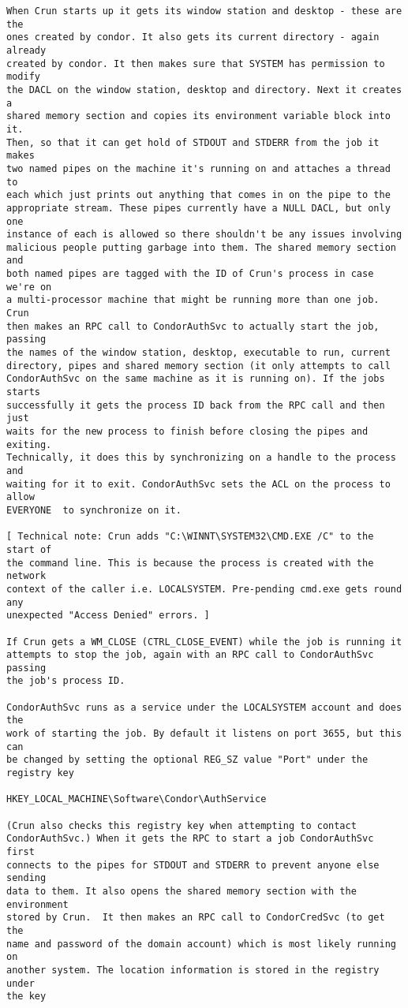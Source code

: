 \begin{verbatim}
When Crun starts up it gets its window station and desktop - these are the 
ones created by condor. It also gets its current directory - again already 
created by condor. It then makes sure that SYSTEM has permission to modify 
the DACL on the window station, desktop and directory. Next it creates a 
shared memory section and copies its environment variable block into it. 
Then, so that it can get hold of STDOUT and STDERR from the job it makes 
two named pipes on the machine it's running on and attaches a thread to 
each which just prints out anything that comes in on the pipe to the 
appropriate stream. These pipes currently have a NULL DACL, but only one 
instance of each is allowed so there shouldn't be any issues involving 
malicious people putting garbage into them. The shared memory section and 
both named pipes are tagged with the ID of Crun's process in case we're on 
a multi-processor machine that might be running more than one job. Crun 
then makes an RPC call to CondorAuthSvc to actually start the job, passing 
the names of the window station, desktop, executable to run, current 
directory, pipes and shared memory section (it only attempts to call 
CondorAuthSvc on the same machine as it is running on). If the jobs starts 
successfully it gets the process ID back from the RPC call and then just 
waits for the new process to finish before closing the pipes and exiting. 
Technically, it does this by synchronizing on a handle to the process and 
waiting for it to exit. CondorAuthSvc sets the ACL on the process to allow 
EVERYONE  to synchronize on it.

[ Technical note: Crun adds "C:\WINNT\SYSTEM32\CMD.EXE /C" to the start of 
the command line. This is because the process is created with the network 
context of the caller i.e. LOCALSYSTEM. Pre-pending cmd.exe gets round any 
unexpected "Access Denied" errors. ]

If Crun gets a WM_CLOSE (CTRL_CLOSE_EVENT) while the job is running it 
attempts to stop the job, again with an RPC call to CondorAuthSvc passing 
the job's process ID.

CondorAuthSvc runs as a service under the LOCALSYSTEM account and does the 
work of starting the job. By default it listens on port 3655, but this can 
be changed by setting the optional REG_SZ value "Port" under the registry key

HKEY_LOCAL_MACHINE\Software\Condor\AuthService

(Crun also checks this registry key when attempting to contact 
CondorAuthSvc.) When it gets the RPC to start a job CondorAuthSvc first 
connects to the pipes for STDOUT and STDERR to prevent anyone else sending 
data to them. It also opens the shared memory section with the environment 
stored by Crun.  It then makes an RPC call to CondorCredSvc (to get the 
name and password of the domain account) which is most likely running on 
another system. The location information is stored in the registry under 
the key


\end{verbatim}
